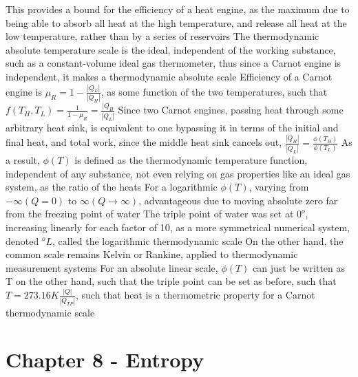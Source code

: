 \begin{outline*}
\3 This provides a bound for the efficiency of a heat engine, as the maximum due to being able to absorb all heat at the high temperature, and release all heat at the low temperature, rather than by a series of reservoirs
\1 The thermodynamic absolute temperature scale is the ideal, independent of the working substance, such as a constant-volume ideal gas thermometer, thus since a Carnot engine is independent, it makes a thermodynamic absolute scale
\2 Efficiency of a Carnot engine is $\mu_R = 1 - \frac{|Q_L|}{|Q_H|}$, as some function of the two temperatures, such that $f(T_H, T_L) = \frac{1}{1 - \mu_R} = \frac{|Q_H}{|Q_L|}$
\2 Since two Carnot engines, passing heat through some arbitrary heat sink, is equivalent to one bypassing it in terms of the initial and final heat, and total work, since the middle heat sink cancels out, $\frac{|Q_H|}{|Q_L|} = \frac{\phi(T_H)}{\phi(T_L)}$
\2 As a result, $\phi(T)$ is defined as the thermodynamic temperature function, independent of any substance, not even relying on gas properties like an ideal gas system, as the ratio of the heats
\3 For a logarithmic $\phi(T)$, varying from $-\infty (Q = 0)$ to $\infty (Q \to \infty)$, advantageous due to moving absolute zero far from the freezing point of water
\4 The triple point of water was set at $0^o$, increasing linearly for each factor of 10, as a more symmetrical numerical system, denoted $^oL$, called the logarithmic thermodynamic scale
\3 On the other hand, the common scale remains Kelvin or Rankine, applied to thermodynamic measurement systems
\2 For an absolute linear scale, $\phi(T)$ can just be written as T on the other hand, such that the triple point can be set as before, such that $T = 273.16 K \frac{|Q|}{|Q_{TP}|}$, such that heat is a thermometric property for a Carnot thermodynamic scale
\end{outline*}
\section{Chapter 8 - Entropy}
